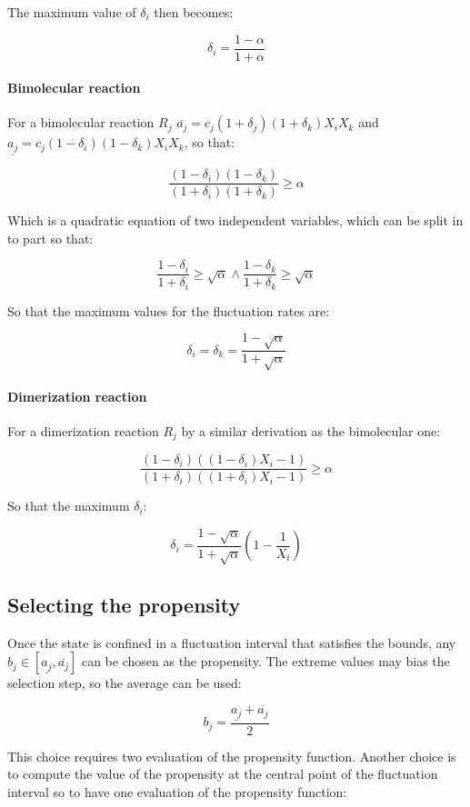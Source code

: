       The maximum value of $\delta_i$ then becomes:

      $$\delta_i = \frac{1-\alpha}{1+\alpha}$$

      \paragraph{Bimolecular reaction}
      For a bimolecular reaction $R_j$ $\overline{a_j} = c_j(1+\delta_j)(1+\delta_k)X_iX_k$ and $\underline{a_j} = c_j(1-\delta_i)(1-\delta_k)X_iX_k$, so that:

      $$\frac{(1-\delta_i)(1-\delta_k)}{(1+\delta_i)(1+\delta_k)}\ge \alpha$$

      Which is a quadratic equation of two independent variables, which can be split in to part so that:

      $$\frac{1-\delta_i}{1+\delta_i}\ge\sqrt{\alpha}\land\frac{1-\delta_k}{1+\delta_k}\ge\sqrt{\alpha}$$

      So that the maximum values for the fluctuation rates are:

      $$\delta_i = \delta_k = \frac{1-\sqrt{\alpha}}{1+\sqrt{\alpha}}$$

      \paragraph{Dimerization reaction}
      For a dimerization reaction $R_j$ by a similar derivation as the bimolecular one:

      $$\frac{(1-\delta_i)((1-\delta_i)X_i-1)}{(1+\delta_i)((1+\delta_i)X_i-1)}\ge\alpha$$

      So that the maximum $\delta_i$:

      $$\delta_i = \frac{1-\sqrt{\alpha}}{1+\sqrt{\alpha}}\left(1-\frac{1}{X_i}\right)$$

  \subsection{Selecting the propensity}
  Once the state is confined in a fluctuation interval that satisfies the bounds, any $b_j\in[\underline{a_j}, \overline{a_j}]$ can be chosen as the propensity.
  The extreme values may bias the selection step, so the average can be used:

  $$b_j = \frac{\underline{a_j}+\overline{a_j}}{2}$$

  This choice requires two evaluation of the propensity function.
  Another choice is to compute the value of the propensity at the central point of the fluctuation interval so to have one evaluation of the propensity function:

